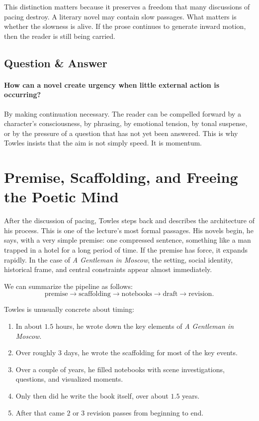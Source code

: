 This distinction matters because it preserves a freedom that many discussions of pacing destroy. A literary novel may contain slow passages. What matters is whether the slowness is alive. If the prose continues to generate inward motion, then the reader is still being carried.

\subsection{Question \& Answer}

\paragraph{How can a novel create urgency when little external action is occurring?}

By making continuation necessary. The reader can be compelled forward by a character's consciousness, by phrasing, by emotional tension, by tonal suspense, or by the pressure of a question that has not yet been answered. This is why Towles insists that the aim is not simply speed. It is momentum.

\section{Premise, Scaffolding, and Freeing the Poetic Mind}

After the discussion of pacing, Towles steps back and describes the architecture of his process. This is one of the lecture's most formal passages. His novels begin, he says, with a very simple premise: one compressed sentence, something like a man trapped in a hotel for a long period of time. If the premise has force, it expands rapidly. In the case of \emph{A Gentleman in Moscow}, the setting, social identity, historical frame, and central constraints appear almost immediately.

We can summarize the pipeline as follows:
\begin{equation}
\text{premise} \longrightarrow \text{scaffolding} \longrightarrow \text{notebooks} \longrightarrow \text{draft} \longrightarrow \text{revision}.
\end{equation}

Towles is unusually concrete about timing:
\begin{enumerate}
\item In about \(1.5\) hours, he wrote down the key elements of \emph{A Gentleman in Moscow}.
\item Over roughly \(3\) days, he wrote the scaffolding for most of the key events.
\item Over a couple of years, he filled notebooks with scene investigations, questions, and visualized moments.
\item Only then did he write the book itself, over about \(1.5\) years.
\item After that came \(2\) or \(3\) revision passes from beginning to end.
\end{enumerate}

